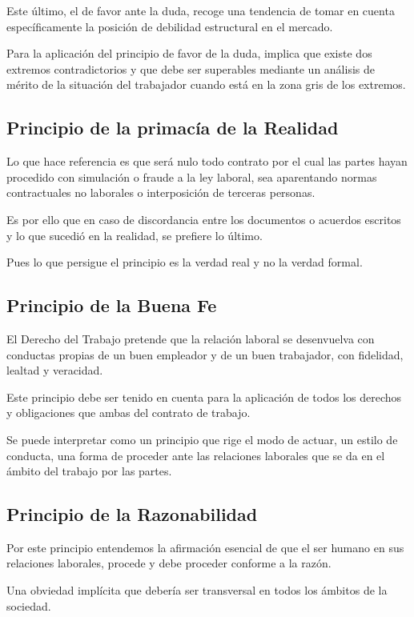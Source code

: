 \documentclass[a4paper]{article}
\begin{document}
Este último, el de favor ante la duda, recoge una tendencia de tomar en cuenta específicamente la posición de debilidad estructural en el mercado. \cite{Luco2014}

Para la aplicación del principio de favor de la duda, implica que existe dos extremos contradictorios y que debe ser superables mediante un análisis de mérito de la situación del trabajador cuando está en la zona gris de los extremos. 

\subsection{Principio de la primacía de la Realidad}

Lo que hace referencia es que será nulo todo contrato por el cual las partes hayan procedido con simulación o fraude a la ley laboral, sea aparentando normas contractuales no laborales o interposición de terceras personas.

Es por ello que en caso de discordancia entre los documentos o acuerdos escritos y lo que sucedió en la realidad, se prefiere lo último. 

Pues lo que persigue el principio es la verdad real y no la verdad formal. 

\subsection{Principio de la Buena Fe}

El Derecho del Trabajo pretende que la relación laboral se desenvuelva con conductas propias de un buen empleador y de un buen trabajador, con fidelidad, lealtad y veracidad.

Este principio debe ser tenido en cuenta para la aplicación de todos los derechos y obligaciones que ambas del contrato de trabajo. 

Se puede interpretar como un principio que rige el modo de actuar, un estilo de conducta, una forma de proceder ante las relaciones laborales que se da en el ámbito del trabajo por las partes. 

\subsection{Principio de la Razonabilidad}

Por este principio entendemos la afirmación esencial de que el ser humano en sus relaciones laborales, procede y debe proceder conforme a la razón. 

Una obviedad implícita que debería ser transversal en todos los ámbitos de la sociedad. 
\end{document}
